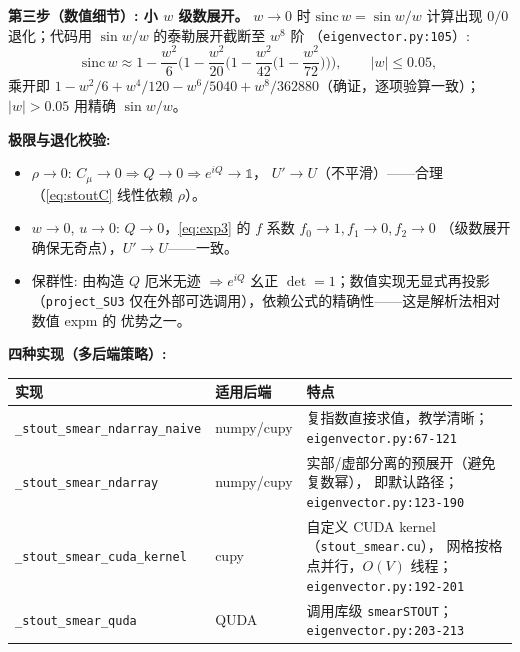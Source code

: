 \documentclass[UTF8]{ctexart}
\begin{document}
\textbf{第三步（数值细节）: 小 $w$ 级数展开。} $w\to 0$ 时 $\mathrm{sinc}\,w = \sin w/w$ 计算出现
$0/0$ 退化；代码用 $\sin w/w$ 的泰勒展开截断至 $w^8$ 阶
（\texttt{eigenvector.py:105}）:
\begin{equation}\label{eq:sinc}
\mathrm{sinc}\,w \approx 1 - \frac{w^2}{6}\Big(1 - \frac{w^2}{20}\Big(1 - \frac{w^2}{42}\Big(1-\frac{w^2}{72}\Big)\Big)),
\qquad |w| \le 0.05,
\end{equation}
乘开即 $1 - w^2/6 + w^4/120 - w^6/5040 + w^8/362880$（确证，逐项验算一致）；
$|w|>0.05$ 用精确 $\sin w/w$。

\textbf{极限与退化校验:}
\begin{itemize}
\item $\rho\to 0$: $C_\mu\to 0 \Rightarrow Q\to 0 \Rightarrow e^{iQ}\to\mathbb{1}$，
  $U'\to U$（不平滑）——合理（\eqref{eq:stoutC} 线性依赖 $\rho$）。
\item $w\to 0$, $u\to 0$: $Q\to 0$，\eqref{eq:exp3} 的 $f$ 系数 $f_0\to 1, f_1\to 0, f_2\to 0$
  （级数展开确保无奇点），$U'\to U$——一致。
\item 保群性: 由构造 $Q$ 厄米无迹 $\Rightarrow e^{iQ}$ 幺正 $\det=1$；数值实现无显式再投影
  （\texttt{project\_SU3} 仅在外部可选调用），依赖公式的精确性——这是解析法相对数值 expm 的
  优势之一。
\end{itemize}

\textbf{四种实现（多后端策略）:}
\begin{xltabular}{\textwidth}{llX}
\toprule
\textcolor{algo}{实现} & 适用后端 & 特点 \\
\midrule
\endhead
\texttt{\_stout\_smear\_ndarray\_naive} & numpy/cupy & 复指数直接求值，教学清晰；
  \texttt{\nolinkurl{eigenvector.py:67-121}} \\
\texttt{\_stout\_smear\_ndarray} & numpy/cupy & 实部/虚部分离的预展开（避免复数幂），
  即默认路径；\texttt{\nolinkurl{eigenvector.py:123-190}} \\
\texttt{\_stout\_smear\_cuda\_kernel} & cupy & 自定义 CUDA kernel（\texttt{stout\_smear.cu}），
  网格按格点并行，$O(V)$ 线程；\texttt{\nolinkurl{eigenvector.py:192-201}} \\
\texttt{\_stout\_smear\_quda} & QUDA & 调用库级 \texttt{smearSTOUT}；
  \texttt{\nolinkurl{eigenvector.py:203-213}} \\
\bottomrule
\end{xltabular}
\end{document}
